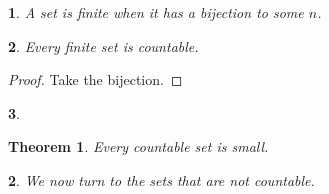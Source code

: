 \documentclass{article}
\theoremstyle{plain}
\newtheorem{theorem}{Theorem}
\newtheorem{point}{}
\newtheorem{para}[theorem]{}
\begin{document}
\begin{point} A set is finite when it has a bijection to some $n$. \end{point}
\begin{point} Every finite set is countable. \end{point}
\begin{proof} Take the bijection. \end{proof}
\begin{point} \ \end{point}
\begin{theorem} Every countable set is small. \end{theorem}
\begin{para} We now turn to the sets that are not countable. \end{para}
\end{document}
